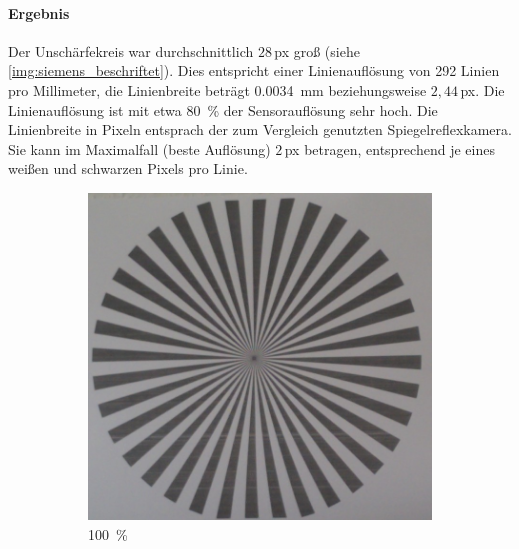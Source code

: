 \documentclass[./00PhotoBox.tex]{subfiles}
\begin{document}
\paragraph{Ergebnis}

Der Unschärfekreis war durchschnittlich $28$\,\gls{px} groß (siehe \autoref{img:siemens_beschriftet}). Dies entspricht einer Linienauflösung von 292 Linien pro Millimeter, die Linienbreite beträgt \SI{0,0034}{\milli\metre} beziehungsweise $2,44$\,\gls{px}. Die Linienauflösung ist mit etwa \SI{80}{\percent} der Sensorauflösung sehr hoch. Die Linienbreite in Pixeln entsprach der zum Vergleich genutzten Spiegelreflexkamera. Sie kann im Maximalfall (beste Auflösung) $2$\,\gls{px} betragen, entsprechend je eines weißen und schwarzen Pixels pro Linie.


\begin{figure}[htbp]
    \centering
    \begin{subfigure}{0.45\textwidth}
        \includegraphics[height=0.9\linewidth]{./img/4_voruntersuchung/siemens.jpg}
        \centering
        \caption{\SI{100}{\percent}}
        \label{img:siemens}
    \end{subfigure}
    \begin{subfigure}{0.45\textwidth}

\end{subfigure}
\end{figure}
\end{document}
